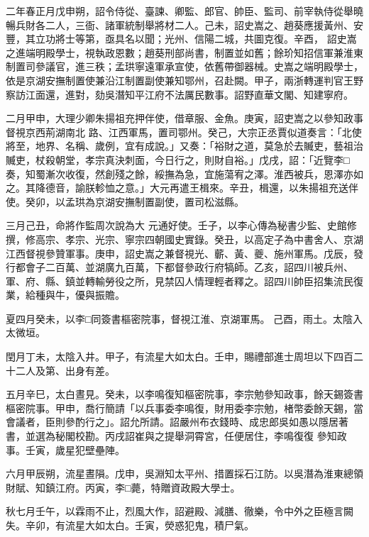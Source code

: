 \begin{pinyinscope}
 二年春正月戊申朔，詔令侍從、臺諫、卿監、郎官、帥臣、監司、前宰執侍從舉曉暢兵財各二人，三衙、諸軍統制舉將材二人。己未，詔史嵩之、趙葵應援黃州、安豐，其立功將士等第，亟具名以聞；光州、信陽二城，共圖克復。辛酉，
 詔史嵩之進端明殿學士，視執政恩數；趙葵刑部尚書，制置並如舊；餘玠知招信軍兼淮東制置司參議官，進三秩；孟珙寧遠軍承宣使，依舊帶御器械。史嵩之端明殿學士，依是京湖安撫制置使兼沿江制置副使兼知鄂州，召赴闕。甲子，兩浙轉運判官王野察訪江面還，進對，劾吳潛知平江府不法厲民數事。詔野直華文閣、知建寧府。



 二月甲申，大理少卿朱揚祖充押伴使，借章服、金魚。庚寅，詔吏嵩之以參知政事督視京西荊湖南北
 路、江西軍馬，置司鄂州。癸己，大宗正丞賈似道奏言：「北使將至，地界、名稱、歲例，宜有成說。」又奏：「裕財之道，莫急於去贓吏，藝祖治贓吏，杖殺朝堂，孝宗真決刺面，今日行之，則財自裕。」戊戌，詔：「近覽李□奏，知蜀漸次收復，然創殘之餘，綏撫為急，宜施蕩宥之澤。淮西被兵，恩澤亦如之。其降德音，諭朕軫恤之意。」大元再遣王楫來。辛丑，楫還，以朱揚祖充送伴使。癸卯，以孟珙為京湖安撫制置副使，置司松滋縣。



 三月己丑，命將作監周次說為大
 元通好使。壬子，以李心傳為秘書少監、史館修撰，修高宗、孝宗、光宗、寧宗四朝國史實錄。癸丑，以高定子為中書舍人、京湖江西督視參贊軍事。庚申，詔史嵩之兼督視光、蘄、黃、夔、施州軍馬。戊辰，發行都會子二百萬、並湖廣九百萬，下都督參政行府犒師。乙亥，詔四川被兵州、軍、府、縣、鎮並轉輸勞役之所，見禁囚人情理輕者釋之。詔四川帥臣招集流民復業，給種與牛，優與振贍。



 夏四月癸未，以李□同簽書樞密院事，督視江淮、京湖軍馬。
 己酉，雨土。太陰入太微垣。



 閏月丁未，太陰入井。甲子，有流星大如太白。壬申，賜禮部進士周坦以下四百二十二人及第、出身有差。



 五月辛巳，太白晝見。癸未，以李鳴復知樞密院事，李宗勉參知政事，餘天錫簽書樞密院事。甲申，喬行簡請「以兵事委李鳴復，財用委李宗勉，楮幣委餘天錫，當會議者，臣則參酌行之」。詔允所請。詔嚴州布衣錢時、成忠郎吳如愚以隱居著書，並選為秘閣校勘。丙戌詔崔與之提舉洞霄宮，任便居住，李鳴復復
 參知政事。壬寅，歲星犯壁壘陣。



 六月甲辰朔，流星晝隕。戊申，吳淵知太平州、措置採石江防。以吳潛為淮東總領財賦、知鎮江府。丙寅，李□薨，特贈資政殿大學士。



 秋七月壬午，以霖雨不止，烈風大作，詔避殿、減膳、徹樂，令中外之臣極言闕失。辛卯，有流星大如太白。壬寅，熒惑犯鬼，積尸氣。




\end{pinyinscope}

